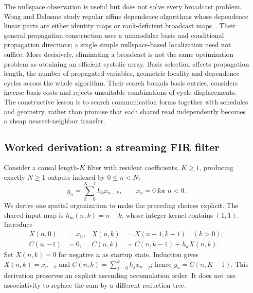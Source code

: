 \documentclass[final,3p,times,authoryear]{elsarticle}
\begin{document}
The nullspace observation is useful but does not solve every broadcast problem. Wong and Delosme study regular affine dependence algorithms whose dependence linear parts are either identity maps or rank-deficient broadcast maps~\citep{wong1992}. Their general propagation construction uses a unimodular basis and conditional propagation directions; a single simple nullspace-based localization need not suffice. More decisively, eliminating a broadcast is not the same optimization problem as obtaining an efficient systolic array. Basis selection affects propagation length, the number of propagated variables, geometric locality and dependence cycles across the whole algorithm. Their search bounds basis entries, considers inverse-basis costs and rejects unsuitable combinations of cycle displacements. The constructive lesson is to search communication forms together with schedules and geometry, rather than promise that each shared read independently becomes a cheap nearest-neighbor transfer.

\subsection{Worked derivation: a streaming FIR filter}
Consider a causal length-$K$ filter with resident coefficients, $K\ge1$, producing exactly $N\ge1$ outputs indexed by $0\le n<N$:
\begin{equation}\label{eq:fir}
 y_n=\sum_{k=0}^{K-1}h_kx_{n-k},\qquad x_n=0\ \text{for }n<0.
\end{equation}
We derive one spatial organization to make the preceding choices explicit. The shared-input map is $h_{\mathrm{in}}(n,k)=n-k$, whose integer kernel contains $(1,1)$. Introduce
\begin{equation}\label{eq:fir-local}
\begin{aligned}
 X(n,0)&=x_n, & X(n,k)&=X(n-1,k-1)\quad(k>0),\\
 C(n,-1)&=0, & C(n,k)&=C(n,k-1)+h_kX(n,k).
\end{aligned}
\end{equation}
Set $X(n,k)=0$ for negative $n$ as startup state. Induction gives $X(n,k)=x_{n-k}$ and $C(n,k)=\sum_{j=0}^{k}h_jx_{n-j}$; hence $y_n=C(n,K-1)$. This derivation preserves an explicit ascending accumulation order. It does not use associativity to replace the sum by a different reduction tree.
\end{document}
